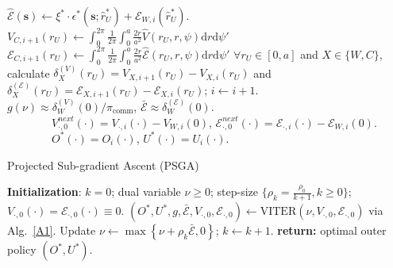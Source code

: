 \documentclass[12pt, draftcls, onecolumn]{IEEEtran}
\theoremstyle{plain}
\theoremstyle{definition}
\theoremstyle{remark}
\begin{document}
\begin{algorithm} [t]
\begin{algorithmic}[1]
        		\State $\hat {\mathcal E}(\mathbf{s}){\gets}\xi^*\cdot\epsilon^{*}(\mathbf{s};\hat r_U^*){+}\mathcal E_{W,i}(\hat r_U^*)$.
        	\EndFor
	\State $V_{C,i{+}1}(r_{U}){\gets}\int_{0}^{2\pi}\frac{1}{2\pi}\int_{0}^{a}\frac{2r}{a^{2}}
	\hat V(r_U,r,\psi)\mathrm{d}r\mathrm{d}\psi'$
	\State ${\mathcal E}_{C,i{+}1}(r_{U}){\gets}\int_{0}^{2\pi}\frac{1}{2\pi}\int_{0}^{a}\frac{2r}{a^{2}}
	\hat {\mathcal E}(r_U,r,\psi)\mathrm{d}r\mathrm{d}\psi'$
	\EndFor
        	\State ${\forall}r_U\in[0,a]$ and $X\in\{W,C\}$, calculate $\delta_X^{(V)}(r_U){=}V_{X,i{+}1}(r_U){-}V_{X,i}(r_U)$
	and $\delta_X^{(\mathcal E)}(r_U){=}\mathcal E_{X,i{+}1}(r_U){-}\mathcal E_{X,i}(r_U)$;
	 $i{\gets}i{+}1$.
         \\
    \Return $g(\nu){\approx}\delta_W^{(V)}(0)/\pi_{\mathrm{comm}}$,
    $\bar{\mathcal E}{\approx}\delta_W^{(\mathcal E)}(0)$.\\
     \ \ \ \ \ \ \ \ $V_{\cdot,0}^{next}(\cdot){=}V_{\cdot,i}(\cdot){-}V_{W,i}(0)$, $\mathcal E_{\cdot,0}^{next}(\cdot){=}\mathcal E_{\cdot,i}(\cdot){-}\mathcal E_{W,i}(0)$.
    \\
     \ \ \ \ \ \ \ \ $O^{*}(\cdot){=}O_{i}(\cdot)$, $U^{*}(\cdot){=}U_{i}(\cdot)$.
    \end{algorithmic}
\end{algorithm}
\begin{algorithm} [t]
\caption{Projected Sub-gradient Ascent (PSGA)}\label{A2}
    \begin{algorithmic}[1]
    \scriptsize
    \State \textbf{Initialization}: $k=0$; dual variable $\nu{\geq}0$; step-size $\{\rho_{k}{=}\frac{\rho_{0}}{k{+}1},k{\geq}0\}$; 
    $V_{\cdot,0}(\cdot){=}\mathcal E_{\cdot,0}(\cdot)\equiv 0$.
    \Repeat %
    	\State  $(O^{*},U^{*},g,\bar{\mathcal E},V_{\cdot,0},\mathcal E_{\cdot,0})\gets\mathrm{VITER}(\nu,V_{\cdot,0},\mathcal E_{\cdot,0})$ via Alg.~\ref{A1}.
    		\State Update $\nu\gets\max\left\{\nu{+}\rho_{k}\bar{\mathcal E},0\right\}$; $k{\gets}k{+}1$. 
     
    \State \textbf{return:} optimal outer policy $(O^{*},U^{*})$.
    \end{algorithmic}
\end{algorithm}
\end{document}
